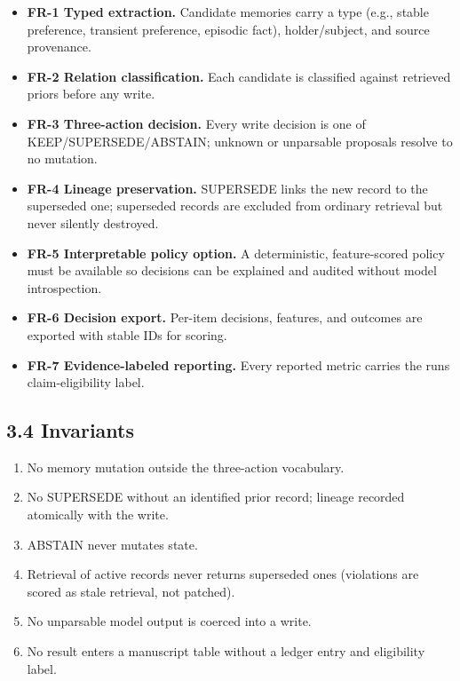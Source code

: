 \begin{itemize}
\item
  \textbf{FR-1 Typed extraction.} Candidate memories carry a type (e.g.,
  stable preference, transient preference, episodic fact),
  holder/subject, and source provenance.
\item
  \textbf{FR-2 Relation classification.} Each candidate is classified
  against retrieved priors before any write.
\item
  \textbf{FR-3 Three-action decision.} Every write decision is one of
  KEEP/SUPERSEDE/ABSTAIN; unknown or unparsable proposals resolve to no
  mutation.
\item
  \textbf{FR-4 Lineage preservation.} SUPERSEDE links the new record to
  the superseded one; superseded records are excluded from ordinary
  retrieval but never silently destroyed.
\item
  \textbf{FR-5 Interpretable policy option.} A deterministic,
  feature-scored policy must be available so decisions can be explained
  and audited without model introspection.
\item
  \textbf{FR-6 Decision export.} Per-item decisions, features, and
  outcomes are exported with stable IDs for scoring.
\item
  \textbf{FR-7 Evidence-labeled reporting.} Every reported metric
  carries the run\textquotesingle s claim-eligibility label.
\end{itemize}

\subsection{3.4 Invariants}\label{invariants}

\begin{enumerate}
\def\labelenumi{\arabic{enumi}.}
\item
  No memory mutation outside the three-action vocabulary.
\item
  No SUPERSEDE without an identified prior record; lineage recorded
  atomically with the write.
\item
  ABSTAIN never mutates state.
\item
  Retrieval of active records never returns superseded ones (violations
  are scored as stale retrieval, not patched).
\item
  No unparsable model output is coerced into a write.
\item
  No result enters a manuscript table without a ledger entry and
  eligibility label.
\end{enumerate}

